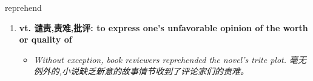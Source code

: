 
\begin{frame}
{\huge reprehend}
\begin{center}
\begin{enumerate}\Large
  \item \textbf{vt. 谴责,责难,批评: to express one's unfavorable opinion of the worth or quality of}
  \begin{itemize}
    \item \em{\Large{Without exception, book reviewers reprehended the novel's trite plot. 毫无例外的,小说缺乏新意的故事情节收到了评论家们的责难。}}
  \end{itemize}
\end{enumerate}
\end{center}
\end{frame}

